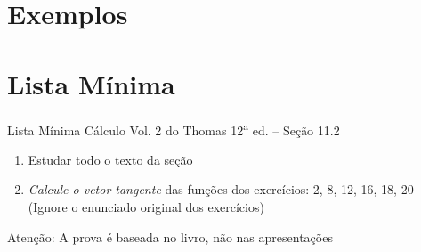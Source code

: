 \documentclass[fleqn,utf8,aspectratio=169,12pt]{beamer}
\begin{document}
\section{Exemplos}







\section{Lista Mínima}

\begin{frame}{Lista Mínima}
  Cálculo Vol. 2 do Thomas 12\textsuperscript{a} ed. -- Seção 11.2
  \begin{enumerate}
    \item Estudar todo o texto da seção
    \item \emph{Calcule o vetor tangente}
          das funções dos exercícios: 2, 8, 12, 16, 18, 20\\
          (Ignore o enunciado original dos exercícios)
  \end{enumerate}

  \vfill
  Atenção: A prova é baseada no livro, não nas apresentações
\end{frame}

\end{document}
